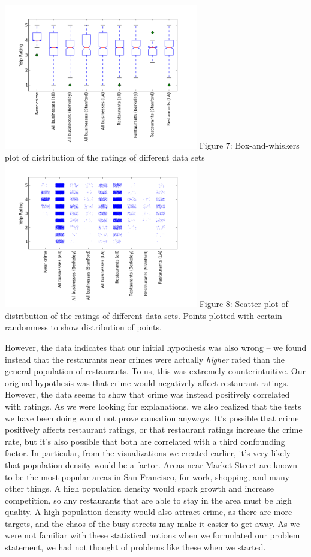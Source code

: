 \documentclass{article}
\begin{document}
\begin{center}
  \includegraphics[keepaspectratio=true, width=320px]{boxplot.png}
  Figure 7: Box-and-whiskers plot of distribution of the ratings of
  different data sets \\[20pt]

  \includegraphics[keepaspectratio=true, width=320px]{scatter_plot.png}
  Figure 8: Scatter plot of distribution of the ratings of different data
  sets. Points plotted with certain randomness to show distribution of
  points. \\[20pt]
\end{center}

However, the data indicates that our initial hypothesis was also wrong --
we found instead that the restaurants near crimes were actually
\textit{higher} rated than the general population of restaurants. To us,
this was extremely counterintuitive. Our original hypothesis was that crime
would negatively affect restaurant ratings. However, the data seems to show
that crime was instead positively correlated with ratings. As we were
looking for explanations, we also realized that the tests we have been
doing would not prove causation anyways. It's possible that crime
positively affects restaurant ratings, or that restaurant ratings increase
the crime rate, but it's also possible that both are correlated with a
third confounding factor. In particular, from the visualizations we created
earlier, it's very likely that population density would be a factor. Areas
near Market Street are known to be the most popular areas in San Francisco,
for work, shopping, and many other things. A high population density would
spark growth and increase competition, so any restaurants that are able to
stay in the area must be high quality. A high population density would also
attract crime, as there are more targets, and the chaos of the busy streets
may make it easier to get away. As we were not familiar with these
statistical notions when we formulated our problem statement, we had not
thought of problems like these when we started.
\end{document}
